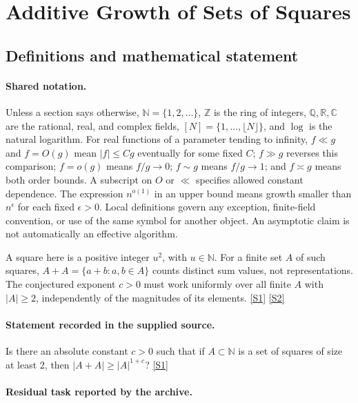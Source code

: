\documentclass[11pt,a4paper]{article}
\newcommand{\N}{\mathbb{N}}
\newcommand{\Z}{\mathbb{Z}}
\newcommand{\Q}{\mathbb{Q}}
\newcommand{\R}{\mathbb{R}}
\newcommand{\C}{\mathbb{C}}
\newcommand{\sref}[2]{\hyperlink{source:#1:#2}{[S#2]}}
\begin{document}
\section{Additive Growth of Sets of Squares}\label{statement}


\subsection{Definitions and mathematical statement}

\paragraph{Shared notation.}Unless a section says otherwise, $\N=\{1,2,\ldots\}$,
$\Z$ is the ring of integers, $\Q,\R,\C$ are the rational, real, and complex
fields, $[N]=\{1,\ldots,\lfloor N\rfloor\}$, and $\log$ is the natural
logarithm. For real functions of a parameter tending to infinity,
$f\ll g$ and $f=O(g)$ mean $|f|\leq Cg$ eventually for some fixed $C$;
$f\gg g$ reverses this comparison; $f=o(g)$ means $f/g\to0$;
$f\sim g$ means $f/g\to1$; and $f\asymp g$ means both order bounds.
A subscript on $O$ or $\ll$ specifies allowed constant dependence.
The expression $n^{o(1)}$ in an upper bound means growth smaller than
$n^\epsilon$ for each fixed $\epsilon>0$. Local definitions govern any
exception, finite-field convention, or use of the same symbol for another
object. An asymptotic claim is not automatically an effective algorithm.



A square here is a positive integer $u^2$, with $u\in\N$. For a finite set $A$ of such squares, $A+A=\{a+b:a,b\in A\}$ counts distinct sum values, not representations. The conjectured exponent $c>0$ must work uniformly over all finite $A$ with $|A|\geq2$, independently of the magnitudes of its elements. \sref{statement}{1} \sref{statement}{2}

\paragraph{Statement recorded in the supplied source.}
Is there an absolute constant $c > 0$ such that if $A \subset \mathbb{N}$ is a set of squares of size at least 2, then $|A + A| \geq |A|^{1+c}$? \sref{statement}{1}

\paragraph{Residual task reported by the archive.}
\end{document}
